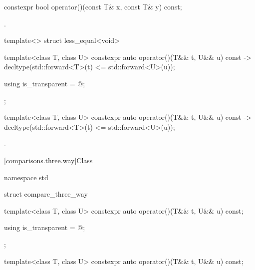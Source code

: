 %
\begin{itemdecl}
constexpr bool operator()(const T& x, const T& y) const;
\end{itemdecl}

\begin{itemdescr}
\pnum
\returns
{}.
\end{itemdescr}

%
\begin{itemdecl}
template<> struct less_equal<void> {
  template<class T, class U> constexpr auto operator()(T&& t, U&& u) const
    -> decltype(std::forward<T>(t) <= std::forward<U>(u));

  using is_transparent = @\unspec@;
};
\end{itemdecl}

%
\begin{itemdecl}
template<class T, class U> constexpr auto operator()(T&& t, U&& u) const
    -> decltype(std::forward<T>(t) <= std::forward<U>(u));
\end{itemdecl}

\begin{itemdescr}
\pnum
\returns
{}.
\end{itemdescr}

[comparisons.three.way]{Class }

%
\begin{codeblock}
namespace std {
  struct compare_three_way {
    template<class T, class U>
      constexpr auto operator()(T&& t, U&& u) const;

    using is_transparent = @\unspec@;
  };
}
\end{codeblock}

\begin{itemdecl}
template<class T, class U>
  constexpr auto operator()(T&& t, U&& u) const;
\end{itemdecl}

